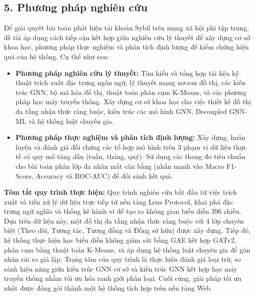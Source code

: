 \subsection{5. Phương pháp nghiên cứu}

\indent\indent Để giải quyết bài toán phát hiện tài khoản Sybil trên mạng xã hội phi tập trung, đề tài áp dụng cách tiếp cận kết hợp giữa nghiên cứu lý thuyết để xây dựng cơ sở khoa học, phương pháp thực nghiệm và phân tích định lượng để kiểm chứng hiệu quả của hệ thống. Cụ thể như sau:\vspace{-0.1cm}
\begin{itemize}[label={--}, itemsep=1pt]
    \item \textbf{Phương pháp nghiên cứu lý thuyết:} Tìm hiểu và tổng hợp tài liệu kỹ thuật trích xuất đặc trưng ngôn ngữ, lý thuyết mạng nơ-ron đồ thị, các kiến trúc GNN, bộ mã hóa đồ thị, thuật toán phân cụm K-Means, và các phương pháp học máy truyền thống. Xây dựng cơ sở khoa học cho việc thiết kế đồ thị đa tầng nhận thức ràng buộc, kiến trúc các mô hình GNN, Decoupled GNN-ML và hệ thống luật chuyên gia.
    \item \textbf{Phương pháp thực nghiệm và phân tích định lượng:} Xây dựng, huấn luyện và đánh giá đối chứng các tổ hợp mô hình trên 3 phạm vi dữ liệu thực tế có quy mô tăng dần (tuần, tháng, quý). Sử dụng các thang đo tiêu chuẩn cho bài toán phân lớp đa nhãn mất cân bằng (nhấn mạnh vào Macro F1-Score, Accuracy và ROC-AUC) để đối sánh kết quả.
\end{itemize}

\textbf{Tóm tắt quy trình thực hiện:} Quy trình nghiên cứu bắt đầu từ việc trích xuất và tiền xử lý dữ liệu trực tiếp từ nền tảng Lens Protocol, khai phá đặc trưng ngữ nghĩa và thống kê hành vi để tạo ra không gian biểu diễn 396 chiều. Dựa trên dữ liệu này, một đồ thị đa tầng nhận thức ràng buộc với 4 lớp chuyên biệt (Theo dõi, Tương tác, Tương đồng và Đồng sở hữu) được xây dựng. Tiếp đó, hệ thống thực hiện học biểu diễn không giám sát bằng GAE kết hợp GATv2, phân cụm bằng thuật toán K-Means, và áp dụng hệ thống luật chuyên gia để gán nhãn rủi ro giả lập. Trọng tâm của quy trình là thực hiện đánh giá loại trừ, so sánh hiệu năng giữa kiến trúc GNN cơ sở và kiến trúc GNN kết hợp học máy truyền thống nhằm tối ưu hóa ranh giới phân loại. Cuối cùng, giải pháp tối ưu nhất được đóng gói thành một hệ thống tích hợp trên nền tảng Web.